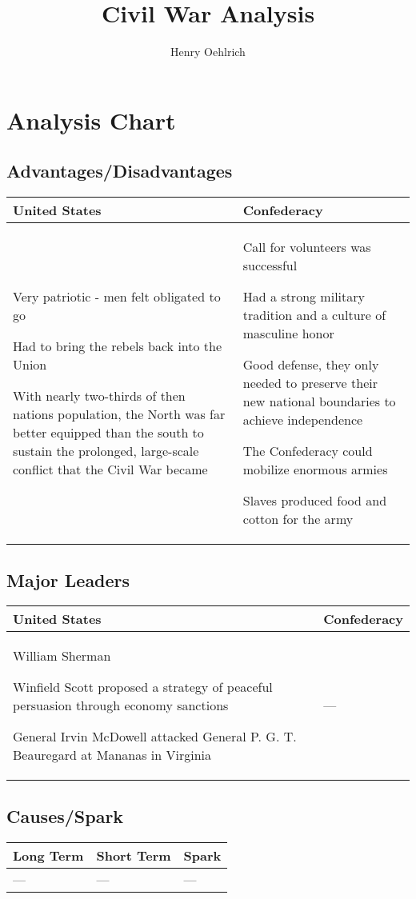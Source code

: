 \documentclass{article}
\title{Civil War Analysis}
\author{Henry Oehlrich}
\begin{document}
\maketitle

\section{Analysis Chart}
\subsection{Advantages/Disadvantages}
\begin{tabular}{|p{7cm}|p{7cm}|}
    \hline
    United States & Confederacy \\
    \hline
    Very patriotic - men felt obligated to go

    Had to bring the rebels back into the Union

    With nearly two-thirds of then nations population, the North was far better
    equipped than the south to sustain the prolonged, large-scale conflict
    that the Civil War became
    &
    Call for volunteers was successful

    Had a strong military tradition and a culture of masculine honor

    Good defense, they only needed to preserve their new national boundaries to
    achieve independence
    
    The Confederacy could mobilize enormous armies

    Slaves produced food and cotton for the army
    \\
    \hline
\end{tabular}

\subsection{Major Leaders}
\begin{tabular}{|p{7cm}|p{7cm}|}
    \hline
    United States & Confederacy \\
    \hline
    William Sherman

    Winfield Scott proposed a strategy of peaceful persuasion through economy
    sanctions

    General Irvin McDowell attacked General P. G. T. Beauregard at Mananas in
    Virginia
    &
    ---
    \\
    \hline
\end{tabular}

\subsection{Causes/Spark}
\begin{tabular}{|p{4cm}|p{4cm}|p{4cm}|}
    \hline
    Long Term & Short Term & Spark \\
    \hline
    ---
    &
    ---
    &
    ---
    \\
    \hline
\end{tabular}
\end{document}
